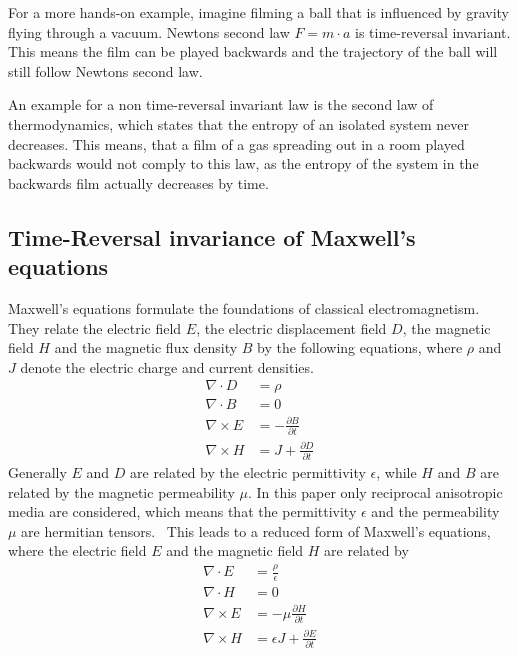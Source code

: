 For a more hands-on example, imagine filming a ball that is influenced by gravity flying through a vacuum.
Newtons second law \({F}=m \cdot {a}\) is time-reversal invariant. This means the film can be played backwards and the trajectory of the ball will still follow Newtons second law.

An example for a non time-reversal invariant law is the second law of thermodynamics, which states that the entropy of an isolated system never decreases.
This means, that a film of a gas spreading out in a room played backwards would not comply to this law, as the entropy of the system in the backwards film actually decreases by time.



\subsection{Time-Reversal invariance of Maxwell's equations}
Maxwell's equations formulate the foundations of classical electromagnetism.
They relate the electric field \(E\), the electric displacement field \(D\), the magnetic field \(H\) and the magnetic flux density \(B\)  by the following equations, where \(\rho \) and \({J}\) denote the electric charge and current densities.
\begin{align}
    \nabla \cdot D &= \rho \label{eq:maxwell1} \\
    \nabla \cdot B &= 0 \label{eq:maxwell2} \\
    \nabla \times E &= -\frac{\partial B}{\partial t} \label{eq:maxwell3} \\
    \nabla \times H &= J + \frac{\partial D}{\partial t} \label{eq:maxwell4}
\end{align}
Generally \(E\) and \(D\) are related by the electric permittivity \(\epsilon \), while \(H\) and \(B\) are related by the magnetic permeability \(\mu \).
In this paper only reciprocal anisotropic media are considered, which means that the permittivity \(\epsilon \) and the permeability \(\mu \) are hermitian tensors.~\parencite{krowne_electromagnetic_1984}
This leads to a reduced form of Maxwell's equations, where the electric field \(E\) and the magnetic field \(H\) are related by
\begin{align}
    \nabla \cdot E &= \frac{\rho}{\epsilon} \label{eq:maxwell5} \\
    \nabla \cdot H &= 0 \label{eq:maxwell6} \\
    \nabla \times E &= -\mu \frac{\partial H}{\partial t} \label{eq:maxwell7} \\
    \nabla \times H &= \epsilon {J} + \frac{\partial E}{\partial t} \label{eq:maxwell8}
\end{align}

